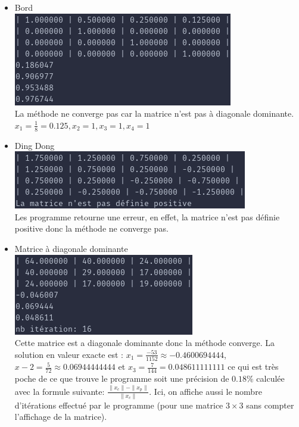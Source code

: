 \documentclass[a4paper]{article}
\begin{document}
\begin{itemize}
\item Bord \\
  \includegraphics[scale=0.5]{./img/cholesky/bord.png} \\
  La méthode ne converge pas car la matrice n'est pas à diagonale dominante.
  $x_{1} = \frac{1}{8} = 0.125 , x_{2} = 1 , x_{3} = 1 , x_{4} = 1$
\item Ding Dong \\
  \includegraphics[scale=0.5]{./img/cholesky/ding_dong.png} \\
  Les programme retourne une erreur, en effet, la matrice n'est pas définie
  positive donc la méthode ne converge pas.
\item Matrice à diagonale dominante \\
  \includegraphics[scale=0.5]{./img/cholesky/chocho_test_final.png} \\
  Cette matrice est a diagonale dominante donc la méthode converge. La solution
  en valeur exacte est : $x_{1} = \frac{-53}{1152} \approx -0.4600694444$,
  $x-{2} = \frac{5}{72} \approx 0.06944444444$ et $x_{3} = \frac{7}{144} =
  0.048611111111$ ce qui est très poche de ce que trouve le programme soit une
  précision de $0.18\%$ calculée avec la formule suivante: $\frac{\parallel
    x_{c} \parallel - \parallel x_{p} \parallel}{\parallel x_{c} \parallel}$.
  Ici, on affiche aussi le nombre d'itérations effectué par le programme (pour
  une matrice $3 \times 3$ sans compter l'affichage de la matrice).
\end{itemize}
\end{document}
